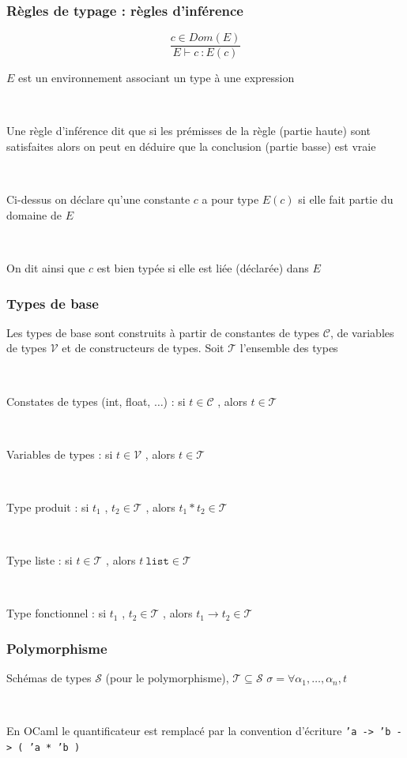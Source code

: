 \documentclass[handout,t]{beamer}
\begin{document}
\begin{frame}

\frametitle{Règles de typage : règles d'inférence}

$$
\frac{c\in Dom(E)}
     {E\vdash c \ : E(c)}
$$


$E$
est un environnement associant un type à une expression

~

Une règle d'inférence dit que si les prémisses de la règle (partie
haute) sont satisfaites alors on peut en déduire que la
conclusion (partie basse) est vraie

~

Ci-dessus on déclare qu'une constante $c$
a pour type
$E ( c )$ si
elle fait partie du domaine de $E$

~

On dit ainsi que $c$
est bien typée si elle est liée (déclarée) dans $E$


\end{frame}

\begin{frame}

\frametitle{Types de base}

Les types de base sont construits à partir de
constantes de types $\mathcal{C}$, de variables de types $\mathcal{V}$ et de
constructeurs de types. Soit
$\mathcal{T}$
l'ensemble des types

~

Constates de types (int, float, $\ldots$) : si $t \in \mathcal{C}$ , alors $t \in \mathcal{T}$

~

Variables de types : si $t \in \mathcal{V}$ , alors $t \in \mathcal{T}$

~

Type produit : si $t_1$ , $t_2 \in \mathcal{T}$ , alors $t_1*t_2 \in \mathcal{T}$

~

Type liste : si $t \in \mathcal{T}$ , alors $t\ \mathtt{list} \in \mathcal{T}$ 

~

Type fonctionnel : si $t_1$ , $t_2 \in \mathcal{T}$ , alors $t_1\rightarrow t_2 \in \mathcal{T}$ 


\end{frame}

\begin{frame}

\frametitle{Polymorphisme}



Schémas de types $\mathcal{S}$ (pour le polymorphisme), $\mathcal{T} \subseteq \mathcal{S}$
$\sigma = \forall \alpha_1 , \ldots, \alpha_n , t$

~


En OCaml le quantificateur est remplacé par la convention
d'écriture
\texttt{'a -> 'b -> ( 'a * 'b ) }



\end{frame}
\end{document}
